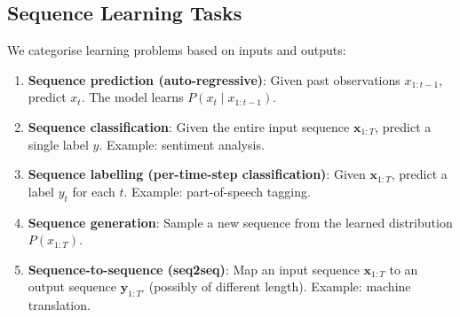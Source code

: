 \documentclass{tufte-handout}
\begin{document}
\begin{marginfigure}
\centering
{}
\caption{Continuous RNN states (red line) can represent exponentially more distinct histories than discrete HMM states (orange line) of the same dimension.}
\label{fig:hmm_vs_rnn_capacity}
\end{marginfigure}

\subsection{Sequence Learning Tasks}

We categorise learning problems based on inputs and outputs:

\begin{enumerate}
    \item \textbf{Sequence prediction (auto-regressive)}: Given past observations $x_{1:t-1}$, predict $x_t$. The model learns $P(x_t \mid x_{1:t-1})$.
    \item \textbf{Sequence classification}: Given the entire input sequence $\mathbf{x}_{1:T}$, predict a single label $y$. Example: sentiment analysis.
    \item \textbf{Sequence labelling (per-time-step classification)}: Given $\mathbf{x}_{1:T}$, predict a label $y_t$ for each $t$. Example: part-of-speech tagging.
    \item \textbf{Sequence generation}: Sample a new sequence from the learned distribution $P(x_{1:T})$.
    \item \textbf{Sequence-to-sequence (seq2seq)}: Map an input sequence $\mathbf{x}_{1:T}$ to an output sequence $\mathbf{y}_{1:T'}$ (possibly of different length). Example: machine translation.
\end{enumerate}
\end{document}
